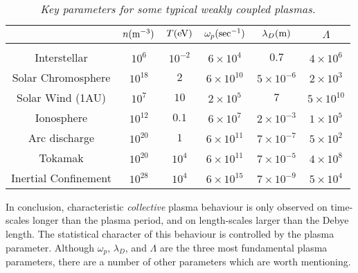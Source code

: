 \begin{table}\centering
\begin{tabular}{c|ccccc}
& $n({\rm m}^{-3})$ & $T({\rm eV})$ & $\omega_p({\rm sec}^{-1})$ & $\lambda_D({\rm m})$ & ${\Lambda}$ \\[0.5ex] \hline
&&&&&\\[-1ex]
Interstellar              & $10^6$              & $10^{-2}$             & $6\times 10^4$                   & $0.7$                       & $4\times 10^6$ \\
Solar Chromosphere &  $10^{18}$ & $2$ & $6\times 10^{10}$ & $5\times 10^{-6}$ & $2\times 10^3$\\
Solar Wind (1AU) & $10^7$ & $10$ & $2\times 10^5$ & $7$ & $5\times 10^{10}$\\
Ionosphere              & $10^{12}$       & $0.1$                   & $6\times 10^7$      &  $2\times 10^{-3}$ & $1\times 10^5$\\
Arc discharge          & $10^{20}$       & $1$                     & $6\times 10^{11}$ & $7\times 10^{-7}$  & $5\times 10^2$ \\
Tokamak      & $10^{20}$        & $10^4 $             & $6\times 10^{11}$ & $7\times 10^{-5}$ & $4\times 10^8$ \\
Inertial Confinement & $10^{28}$ & $10^4$ & $6\times 10^{15}$ & $7\times 10^{-9}$ & $5\times 10^4$\\
\end{tabular}
\caption{{\em Key parameters for some typical weakly coupled plasmas.}}
\label{t1}
\end{table}

In conclusion, characteristic {\em collective}\/
plasma behaviour is only observed on time-scales
longer than the plasma period, and on length-scales larger than the Debye length.
The statistical character of this behaviour is controlled by the plasma parameter.
Although $\omega_p$, $\lambda_D$, and ${\Lambda}$ are the three most fundamental
plasma parameters, there are a number of other parameters which are worth
mentioning. 

